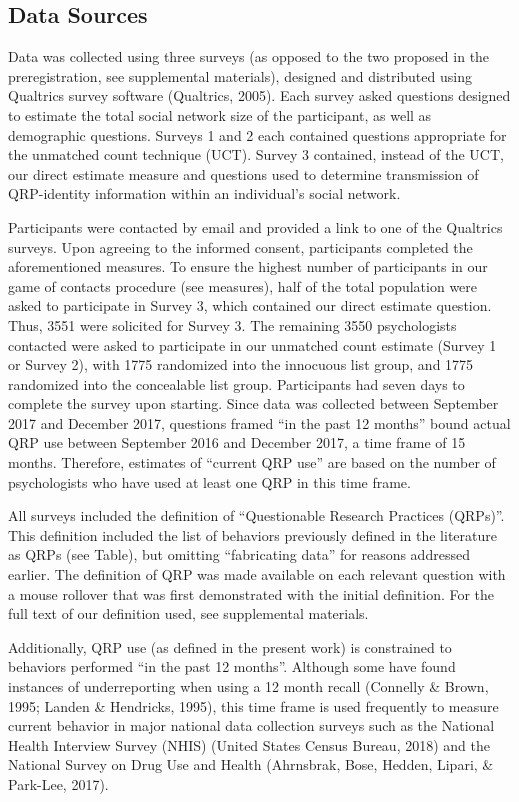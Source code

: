 \documentclass[jou]{apa6}
\theoremstyle{definition}
\theoremstyle{definition}
\theoremstyle{definition}
\theoremstyle{remark}
\begin{document}
\subsection{Data Sources}\label{data-sources}

Data was collected using three surveys (as opposed to the two proposed
in the preregistration, see supplemental materials), designed and
distributed using Qualtrics survey software (Qualtrics, 2005). Each
survey asked questions designed to estimate the total social network
size of the participant, as well as demographic questions. Surveys 1 and
2 each contained questions appropriate for the unmatched count technique
(UCT). Survey 3 contained, instead of the UCT, our direct estimate
measure and questions used to determine transmission of QRP-identity
information within an individual's social network.

Participants were contacted by email and provided a link to one of the
Qualtrics surveys. Upon agreeing to the informed consent, participants
completed the aforementioned measures. To ensure the highest number of
participants in our game of contacts procedure (see measures), half of
the total population were asked to participate in Survey 3, which
contained our direct estimate question. Thus, 3551 were solicited for
Survey 3. The remaining 3550 psychologists contacted were asked to
participate in our unmatched count estimate (Survey 1 or Survey 2), with
1775 randomized into the innocuous list group, and 1775 randomized into
the concealable list group. Participants had seven days to complete the
survey upon starting. Since data was collected between September 2017
and December 2017, questions framed \enquote{in the past 12 months}
bound actual QRP use between September 2016 and December 2017, a time
frame of 15 months. Therefore, estimates of \enquote{current QRP use}
are based on the number of psychologists who have used at least one QRP
in this time frame.

All surveys included the definition of \enquote{Questionable Research
Practices (QRPs)}. This definition included the list of behaviors
previously defined in the literature as QRPs (see Table), but omitting
\enquote{fabricating data} for reasons addressed earlier. The definition
of QRP was made available on each relevant question with a mouse
rollover that was first demonstrated with the initial definition. For
the full text of our definition used, see supplemental materials.

Additionally, QRP use (as defined in the present work) is constrained to
behaviors performed \enquote{in the past 12 months}. Although some have
found instances of underreporting when using a 12 month recall (Connelly
\& Brown, 1995; Landen \& Hendricks, 1995), this time frame is used
frequently to measure current behavior in major national data collection
surveys such as the National Health Interview Survey (NHIS) (United
States Census Bureau, 2018) and the National Survey on Drug Use and
Health (Ahrnsbrak, Bose, Hedden, Lipari, \& Park-Lee, 2017).
\end{document}
